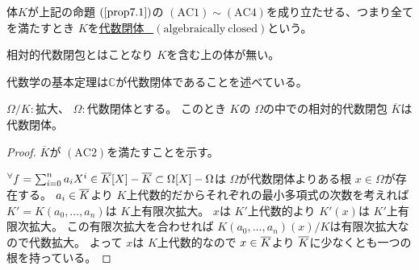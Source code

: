 \documentclass[../master_galois_theory]{subfiles}
\begin{document}
\begin{defi}
  体$K$が上記の命題 $(\mathrm{\ref{prop7.1}})$の $(\mathrm{AC}1) \sim (\mathrm{AC}4)$を成り立たせる、つまり全てを満たすとき
  $K$を\underline{代数閉体 \  $(\mathrm{algebraically \  closed})$}という。

  相対的代数閉包とはことなり $K$を含む上の体が無い。
\end{defi}

\begin{exam}
  代数学の基本定理は$\mathbb{C}$が代数閉体であることを述べている。
\end{exam}

\begin{prop}
  $\Omega/K:$拡大、 $\Omega :$代数閉体とする。
  このとき $K$の $\Omega$の中での相対的代数閉包 $\overline{K}$は代数閉体。
\end{prop}

\begin{proof}
  $\overline{K}$が $(\mathrm{AC}2)$を満たすことを示す。

  ${}^\forall f = \sum_{i=0}^n a_i X^i \in \overline{K}[X] - \overline{K} \subset \Omega[X] - \Omega$は
  $\Omega$が代数閉体よりある根 $x \in \Omega$が存在する。
  $a_i \in \overline{K}$より $K$上代数的だからそれぞれの最小多項式の次数を考えれば
  $K' = K(a_0 , \dots , a_n)$は $K$上有限次拡大。
  $x$は $K'$上代数的より
  $K'(x)$は $K'$上有限次拡大。
  この有限次拡大を合わせれば $K(a_0 , \dots , a_n)(x)/K$は有限次拡大なので代数拡大。
  よって $x$は $K$上代数的なので $x \in \overline{K}$より $\overline{K}$に少なくとも一つの根を持っている。
\end{proof}
\end{document}
